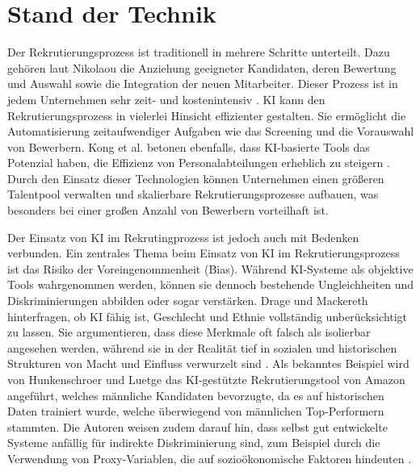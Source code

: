 
\chapter{Stand der Technik}
Der Rekrutierungsprozess ist traditionell in mehrere Schritte unterteilt. Dazu gehören laut Nikolaou die Anziehung geeigneter Kandidaten, deren Bewertung und Auswahl sowie die Integration der neuen Mitarbeiter. Dieser Prozess ist in jedem Unternehmen sehr zeit- und kostenintensiv \cite{nikolaou:2021}. \acs{KI} kann den Rekrutierungsprozess in vielerlei Hinsicht effizienter gestalten. Sie ermöglicht die Automatisierung zeitaufwendiger Aufgaben wie das Screening und die Vorauswahl von Bewerbern. Kong et al. betonen ebenfalls, dass \acs{KI}-basierte Tools das Potenzial haben, die Effizienz von Personalabteilungen erheblich zu steigern \cite{kong:2021}. Durch den Einsatz dieser Technologien können Unternehmen einen größeren Talentpool verwalten und skalierbare Rekrutierungsprozesse aufbauen, was besonders bei einer großen Anzahl von Bewerbern vorteilhaft ist.

Der Einsatz von \acs{KI} im Rekrutingprozess ist jedoch auch mit Bedenken verbunden. Ein zentrales Thema beim Einsatz von \acs{KI} im Rekrutierungsprozess ist das Risiko der Voreingenommenheit (Bias). Während \acs{KI}-Systeme als objektive Tools wahrgenommen werden, können sie dennoch bestehende Ungleichheiten und Diskriminierungen abbilden oder sogar verstärken. Drage und Mackereth hinterfragen, ob \acs{KI} fähig ist, Geschlecht und Ethnie vollständig unberücksichtigt zu lassen. Sie argumentieren, dass diese Merkmale oft falsch als isolierbar angesehen werden, während sie in der Realität tief in sozialen und historischen Strukturen von Macht und Einfluss verwurzelt sind \cite{drage:2022}. Als bekanntes Beispiel wird von Hunkenschroer und Luetge das \acs{KI}-gestützte Rekrutierungstool von Amazon angeführt, welches männliche Kandidaten bevorzugte, da es auf historischen Daten trainiert wurde, welche überwiegend von männlichen Top-Performern stammten. Die Autoren weisen zudem darauf hin, dass selbst gut entwickelte Systeme anfällig für indirekte Diskriminierung sind, zum Beispiel durch die Verwendung von Proxy-Variablen, die auf sozioökonomische Faktoren hindeuten \cite{hunkenschroer:2022}.

